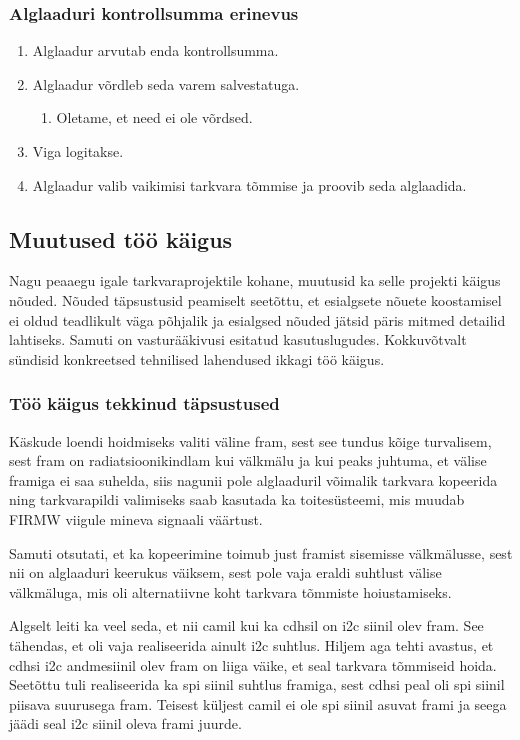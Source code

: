 \documentclass[12pt,a4paper]{article}
\begin{document}
\subsubsection{Alglaaduri kontrollsumma erinevus}
\begin{enumerate}
	\item Alglaadur arvutab enda kontrollsumma.
	\item Alglaadur võrdleb seda varem salvestatuga.
		\begin{enumerate}
			\item Oletame, et need ei ole võrdsed.
		\end{enumerate}
	\item Viga logitakse.
	\item Alglaadur valib vaikimisi tarkvara tõmmise ja proovib seda alglaadida.
\end{enumerate}

\subsection{Muutused töö käigus}
Nagu peaaegu igale tarkvaraprojektile kohane, muutusid ka selle projekti käigus
nõuded. Nõuded täpsustusid peamiselt seetõttu, et esialgsete nõuete koostamisel
ei oldud teadlikult väga põhjalik ja esialgsed nõuded jätsid päris mitmed
detailid lahtiseks. Samuti on vasturääkivusi esitatud kasutuslugudes.
Kokkuvõtvalt sündisid konkreetsed tehnilised lahendused ikkagi töö käigus.

\subsubsection{Töö käigus tekkinud täpsustused}
Käskude loendi hoidmiseks valiti väline \gls{fram}, sest see tundus kõige
turvalisem, sest \gls{fram} on radiatsioonikindlam kui välkmälu ja kui peaks
juhtuma, et välise \gls{fram}iga ei saa suhelda, siis nagunii pole alglaaduril
võimalik tarkvara kopeerida ning tarkvarapildi valimiseks saab kasutada ka
toitesüsteemi, mis muudab FIRMW viigule mineva signaali väärtust.

Samuti otsutati, et ka kopeerimine toimub just \gls{fram}ist sisemisse
välkmälusse, sest nii on alglaaduri keerukus väiksem, sest pole vaja eraldi
suhtlust välise välkmäluga, mis oli alternatiivne koht tarkvara tõmmiste
hoiustamiseks.

Algselt leiti ka veel seda, et nii \gls{cam}il kui ka \gls{cdhs}il on \gls{i2c}
siinil olev \gls{fram}.  See tähendas, et oli vaja realiseerida ainult
\gls{i2c} suhtlus. Hiljem aga tehti avastus, et \gls{cdhs}i \gls{i2c}
andmesiinil olev \gls{fram} on liiga väike, et seal tarkvara tõmmiseid hoida.
Seetõttu tuli realiseerida ka \gls{spi} siinil suhtlus \gls{fram}iga, sest
\gls{cdhs}i peal oli \gls{spi} siinil piisava suurusega \gls{fram}. Teisest
küljest \gls{cam}il ei ole \gls{spi} siinil asuvat \gls{fram}i ja seega
jäädi seal \gls{i2c} siinil oleva \gls{fram}i juurde.
\end{document}
